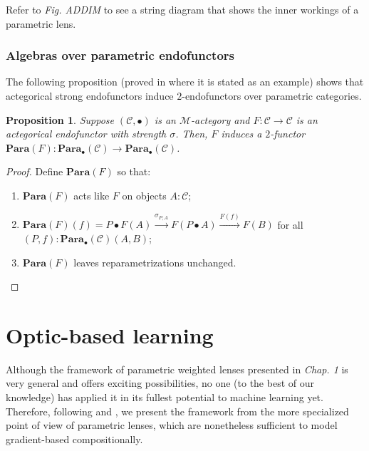 \documentclass[12pt,a4paper,openright,twoside]{report}
\theoremstyle{plain}
\newtheorem{proposition}{Proposition}
\theoremstyle{definition}
\begin{document}
Refer to \textit{Fig. ADDIM} to see a string diagram that shows the inner workings of a parametric lens.

\subsubsection{Algebras over parametric endofunctors}

The following proposition (proved in \cite{gavranovicposition} where it is stated as an example) shows that actegorical strong endofunctors induce $2$-endofunctors over parametric categories.

\begin{proposition}
  \label{prop: paraend}
  Suppose $(\mathcal{C}, \bullet)$ is an $\mathcal{M}$-actegory and $F: \mathcal{C} \to \mathcal{C}$ is an actegorical endofunctor with strength $\sigma$. Then, $F$ induces a  $2$-functor $\mathbf{Para}(F): \mathbf{Para}_{\bullet}(\mathcal{C}) \to \mathbf{Para}_{\bullet}(\mathcal{C})$.
\end{proposition}
\begin{proof}
  Define $\mathbf{Para}(F)$ so that: 
  \begin{enumerate}
    \item $\mathbf{Para}(F)$ acts like $F$ on objects $A: \mathcal{C}$;
    \item $\mathbf{Para}(F)(f) = P \bullet F(A) \stackrel{\sigma_{P,A}}{\longrightarrow} F(P \bullet A) \stackrel{F(f)}{\longrightarrow} F(B)$ for all $(P,f):\mathbf{Para}_{\bullet}(\mathcal{C})(A,B)$;
    \item $\mathbf{Para}(F)$ leaves reparametrizations unchanged.
  \end{enumerate}
\end{proof}



\section{Optic-based learning}
\label{sec: opticbasedlearning}

Although the framework of parametric weighted lenses presented in \textit{Chap. 1} is very general and offers exciting possibilities, no one (to the best of our knowledge) has applied it in its fullest potential to machine learning yet. Therefore, following \cite{gavranovic2024fundamental} and \cite{cruttwell2022categorical}, we present the framework from the more specialized point of view of parametric lenses, which are nonetheless sufficient to model gradient-based compositionally.
\end{document}

